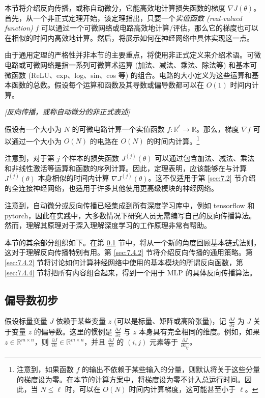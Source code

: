 本节将介绍反向传播，或称自动微分，它能高效地计算损失函数的梯度 $\nabla J(\theta)$。首先，从一个非正式定理开始，该定理指出，只要一个\textit{实值函数 (real-valued function)} $f$ 可以通过一个可微网络或电路高效地计算/评估，那么它的梯度也可以在相似的时间内高效地计算。然后，将展示如何在神经网络中具体实现这一点。

由于通用定理的严格性并非本节的主要重点，将使用非正式定义来介绍术语。可微电路或可微网络是指一系列可微算术运算 (加法、减法、乘法、除法等) 和基本可微函数 (ReLU、exp、log、sin、cos 等) 的组合。电路的大小定义为这些运算和基本函数的总数。假设每个运算和函数及其导数或偏导数都可以在 $O(1)$ 时间内计算。

\begin{theorem}\label{theorem:7.4.1}
    \textit{[反向传播，或称自动微分的非正式表述]} 
    
    \noindent 假设有一个大小为 $N$ 的可微电路计算一个实值函数 $f: \mathbb{R}^\ell \to \mathbb{R}$。那么，梯度 $\nabla f$ 可以通过一个大小为 $O(N)$ 的电路在 $O(N)$ 的时间内计算。\footnote{注意到，如果函数 $f$ 的输出不依赖于某些输入的分量，则默认将关于这些分量的梯度设为零。在本节的计算方案中，将梯度设为零不计入总运行时间。因此，当 $N \le \ell$ 时，可以在 $O(N)$ 时间内计算梯度，这可能甚至小于 $\ell$。}
\end{theorem}

注意到，对于第 $j$ 个样本的损失函数 $J^{(j)}(\theta)$ 可以通过包含加法、减法、乘法和非线性激活等运算和函数的序列计算。因此，定理表明，应该能够在与计算 $J^{(j)}(\theta)$ 本身相似的时间内计算 $\nabla J^{(j)}(\theta)$。这不仅适用于第 \ref{sec:7.2} 节介绍的全连接神经网络，也适用于许多其他使用更高级模块的神经网络。

注意到，自动微分或反向传播已经集成到所有深度学习库中，例如 tensorflow 和 pytorch，因此在实践中，大多数情况下研究人员无需编写自己的反向传播算法。然而，理解其原理对于深入理解深度学习的工作原理非常有帮助。

本节的其余部分组织如下。在第 \ref{sec:7.4.1} 节中，将从一个新的角度回顾基本链式法则，这对于理解反向传播特别有用。第 \ref{sec:7.4.2} 节将介绍反向传播的通用策略。第 \ref{sec:7.4.2} 节将讨论如何计算神经网络中使用的基本模块的所谓反向函数，第 \ref{sec:7.4.4} 节将把所有内容组合起来，得到一个用于 MLP 的具体反向传播算法。

\subsection{偏导数初步}\label{sec:7.4.1}

假设标量变量 $J$ 依赖于某些变量 $z$ (可以是标量、矩阵或高阶张量)，记 $\frac{\partial J}{\partial z}$ 为 $J$ 关于变量 $z$ 的偏导数。这里的惯例是 $\frac{\partial J}{\partial z}$ 与 $z$ 本身具有完全相同的维度。例如，如果 $z \in \mathbb{R}^{m \times n}$，则 $\frac{\partial J}{\partial z} \in \mathbb{R}^{m \times n}$，并且 $\frac{\partial J}{\partial z}$ 的 $(i, j)$ 元素等于 $\frac{\partial J}{\partial z_{ij}}$。

